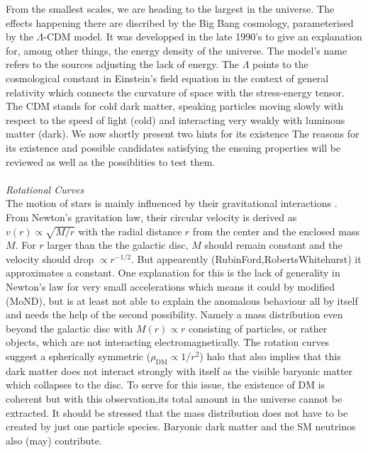 From the smallest scales, we are heading to the largest in the universe. The effects happening there are discribed by the Big Bang cosmology, parameterised
by the $\Lambda$-CDM model. It was developped in the late 1990's \cite{LambdaCDM} to give an explanation for, among other things, the energy density of the 
universe. The model's name refers to the sources adjusting the lack of energy. The $\Lambda$ points to the cosmological constant in Einstein's field equation
in the context of general relativity which connects the curvature of space with the stress-energy tensor.
The CDM stands for cold dark matter, speaking particles moving slowly with respect to the speed of light (cold) and interacting very weakly with luminous
matter (dark). We now shortly present two hints for its existence
The reasons for its existence and possible candidates satisfying the ensuing properties will be reviewed as well as the possiblities to test them.\\
\\ \textit{Rotational Curves}\\
\noindent The motion of stars is mainly influenced by their gravitational interactions \cite{LectDMLis}. From Newton's gravitation law, their circular velocity 
is derived as
$v(r)\propto\sqrt{M/r}$ with the radial distance $r$ from the center and the enclosed mass $M$. For $r$ larger than the the galactic disc, $M$ should remain
constant and the velocity should drop $\propto r^{-1/2}$. But appearently (RubinFord,RobertsWhitehurst) it approximates a constant. One explanation for this
is the lack of generality in Newton's law for very small accelerations which means it could by modified (MoND), but is at least not able to 
explain the anomalous behaviour all by itself \cite{11015122}\cite{160607790} and needs the help of the second possibility. Namely a mass distribution even beyond the galactic
disc with $M(r)\propto r$ consisting of particles, or rather objects, which are not interacting electromagnetically. The rotation curves suggest a 
spherically symmetric ($\rho_\text{DM}\propto 1/r^2$) halo that also implies that this dark matter does not interact strongly with itself as the visible 
baryonic matter which collapses to the disc. To serve for this issue, the existence of DM is coherent but with this observation,its total amount in the 
universe cannot be extracted. It should be stressed that the mass distribution does not have to be created by just one particle species. Baryonic dark matter
and the SM neutrinos also (may) contribute. \\
